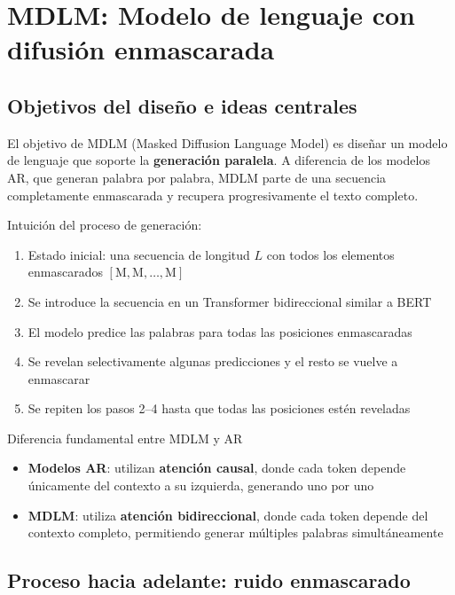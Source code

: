 \section{MDLM: Modelo de lenguaje con difusión enmascarada}

\subsection{Objetivos del diseño e ideas centrales}

El objetivo de MDLM (Masked Diffusion Language Model) es diseñar un modelo de lenguaje que soporte la \textbf{generación paralela}. A diferencia de los modelos AR, que generan palabra por palabra, MDLM parte de una secuencia completamente enmascarada y recupera progresivamente el texto completo.

Intuición del proceso de generación:
\begin{enumerate}
    \item Estado inicial: una secuencia de longitud $L$ con todos los elementos enmascarados $[\text{M}, \text{M}, \ldots, \text{M}]$
    \item Se introduce la secuencia en un Transformer bidireccional similar a BERT
    \item El modelo predice las palabras para todas las posiciones enmascaradas
    \item Se revelan selectivamente algunas predicciones y el resto se vuelve a enmascarar
    \item Se repiten los pasos 2--4 hasta que todas las posiciones estén reveladas
\end{enumerate}

\begin{importantbox}{Diferencia fundamental entre MDLM y AR}
\begin{itemize}
    \item \textbf{Modelos AR}: utilizan \textbf{atención causal}, donde cada token depende únicamente del contexto a su izquierda, generando uno por uno
    \item \textbf{MDLM}: utiliza \textbf{atención bidireccional}, donde cada token depende del contexto completo, permitiendo generar múltiples palabras simultáneamente
\end{itemize}
\end{importantbox}

\subsection{Proceso hacia adelante: ruido enmascarado}

